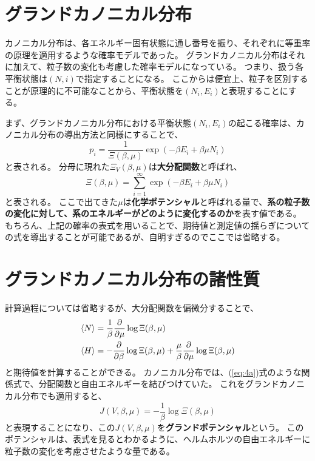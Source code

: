 \documentclass[a4paper]{jsreport}
\begin{document}
        \section{グランドカノニカル分布}
            カノニカル分布は、各エネルギー固有状態に通し番号を振り、それぞれに等重率の原理を適用するような確率モデルであった。
            グランドカノニカル分布はそれに加えて、粒子数の変化も考慮した確率モデルになっている。
            つまり、扱う各平衡状態は$(N, i)$で指定することになる。
            ここからは便宜上、粒子を区別することが原理的に不可能なことから、平衡状態を$(N_i, E_i)$と表現することにする。\par
            まず、グランドカノニカル分布における平衡状態$(N_i, E_i)$の起こる確率は、カノニカル分布の導出方法と同様にすることで、
            \begin{equation}
                p_i = \frac{1}{\Xi(\beta, \mu)} \exp(-\beta E_i + \beta \mu N_i)
            \end{equation}
            と表される。
            分母に現れた$\Xi_V(\beta, \mu)$は\textbf{大分配関数}と呼ばれ、
            \begin{equation}
                \Xi(\beta, \mu) = \sum_{i=1}^{\infty}\exp(-\beta E_i + \beta \mu N_i) 
            \end{equation}
            と表される。
            ここで出てきた$\mu$は\textbf{化学ポテンシャル}と呼ばれる量で、\textbf{系の粒子数の変化に対して、系のエネルギーがどのように変化するのか}を表す値である。
            もちろん、上記の確率の表式を用いることで、期待値と測定値の揺らぎについての式を導出することが可能であるが、自明すぎるのでここでは省略する。

        \section{グランドカノニカル分布の諸性質}
            計算過程については省略するが、大分配関数を偏微分することで、
            \begin{align}
                \ev{N} &= \frac{1}{\beta} \frac{\partial}{\partial\mu} \log \Xi(\beta, \mu) \\
                \ev{H} &= - \frac{\partial}{\partial \beta} \log \Xi(\beta, \mu) + \frac{\mu}{\beta}\frac{\partial}{\partial \mu} \log \Xi(\beta, \mu)
            \end{align}
            と期待値を計算することができる。
            カノニカル分布では、(\ref{eq:4a})式のような関係式で、分配関数と自由エネルギーを結びつけていた。
            これをグランドカノニカル分布でも適用すると、
            \begin{equation}
                J(V, \beta, \mu) = - \frac{1}{\beta} \log \Xi(\beta, \mu)
            \end{equation}
            と表現することになり、この$J(V, \beta, \mu)$を\textbf{グランドポテンシャル}という。
            このポテンシャルは、表式を見るとわかるように、ヘルムホルツの自由エネルギーに粒子数の変化を考慮させたような量である。
\end{document}
